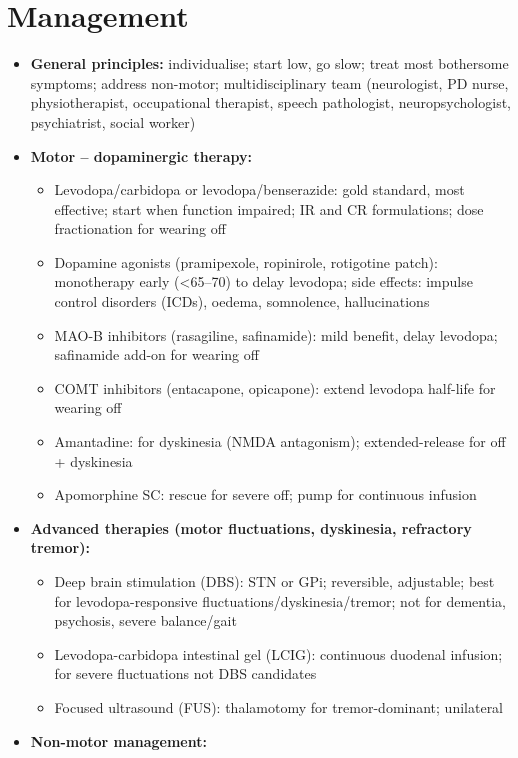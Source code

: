 \section*{Management}
\begin{itemize}
    \item \textbf{General principles:} individualise; start low, go slow; treat most bothersome symptoms; address non-motor; multidisciplinary team (neurologist, PD nurse, physiotherapist, occupational therapist, speech pathologist, neuropsychologist, psychiatrist, social worker)
    \item \textbf{Motor -- dopaminergic therapy:}
    \begin{itemize}
        \item Levodopa/carbidopa or levodopa/benserazide: gold standard, most effective; start when function impaired; IR and CR formulations; dose fractionation for wearing off
        \item Dopamine agonists (pramipexole, ropinirole, rotigotine patch): monotherapy early (<65--70) to delay levodopa; side effects: impulse control disorders (ICDs), oedema, somnolence, hallucinations
        \item MAO-B inhibitors (rasagiline, safinamide): mild benefit, delay levodopa; safinamide add-on for wearing off
        \item COMT inhibitors (entacapone, opicapone): extend levodopa half-life for wearing off
        \item Amantadine: for dyskinesia (NMDA antagonism); extended-release for off + dyskinesia
        \item Apomorphine SC: rescue for severe off; pump for continuous infusion
    \end{itemize}
    \item \textbf{Advanced therapies (motor fluctuations, dyskinesia, refractory tremor):}
    \begin{itemize}
        \item Deep brain stimulation (DBS): STN or GPi; reversible, adjustable; best for levodopa-responsive fluctuations/dyskinesia/tremor; not for dementia, psychosis, severe balance/gait
        \item Levodopa-carbidopa intestinal gel (LCIG): continuous duodenal infusion; for severe fluctuations not DBS candidates
        \item Focused ultrasound (FUS): thalamotomy for tremor-dominant; unilateral
    \end{itemize}
    \item \textbf{Non-motor management:}

\end{itemize}
